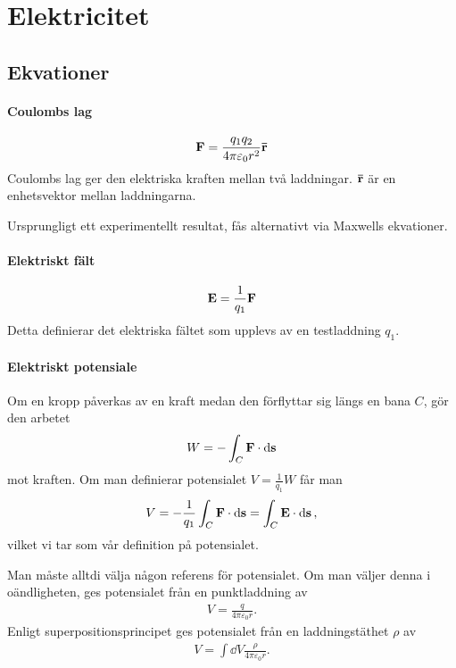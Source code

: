 \section{Elektricitet}

\subsection{Ekvationer}

\paragraph{Coulombs lag}
\begin{align*}
	\vect{F} = \frac{q_1q_2}{4\pi\varepsilon_0 r^2}\vect{\bar{r}}
\end{align*}
Coulombs lag ger den elektriska kraften mellan två laddningar. $\vect{\bar{r}}$ är en enhetsvektor mellan laddningarna.

\deriv
Ursprungligt ett experimentellt resultat, fås alternativt via Maxwells ekvationer.

\paragraph{Elektriskt fält}
\begin{align*}
	\vect{E} = \frac{1}{q_1}\vect{F}
\end{align*}
Detta definierar det elektriska fältet som upplevs av en testladdning $q_1$.

\paragraph{Elektriskt potensiale}
Om en kropp påverkas av en kraft medan den förflyttar sig längs en bana $C$, gör den arbetet
\begin{align*}
	W = -\int_{C}\vect{F}\cdot\dd{\vect{s}}
\end{align*}
mot kraften. Om man definierar potensialet $V = \frac{1}{q_1}W$ får man
\begin{align*}
	V = -\frac{1}{q_1}\int_{C}\vect{F}\cdot\dd{\vect{s}} = \int_{C}\vect{E}\cdot\dd{\vect{s}},
\end{align*}
vilket vi tar som vår definition på potensialet.

Man måste alltdi välja någon referens för potensialet. Om man väljer denna i oändligheten, ges potensialet från en punktladdning av
\begin{align*}
	V = \frac{q}{4\pi\varepsilon_0 r}.
\end{align*}
Enligt superpositionsprincipet ges potensialet från en laddningstäthet $\rho$ av
\begin{align*}
	V = \int\dd{V}\frac{\rho}{4\pi\varepsilon_0 r}.
\end{align*}

